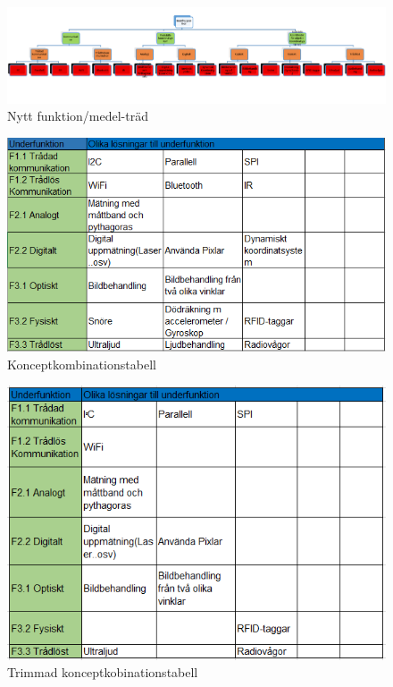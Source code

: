 \documentclass[11pt, a4paper]{report}
\begin{document}
\begin{figure}[H]
	\begin{center}
		\includegraphics [width=12cm,angle=0]{funktionmedel2.png}
		\caption{Nytt funktion/medel-träd}
		\label{fig:funktionmedel2}
	\end{center}
\end{figure}

\begin{figure}[H]
	\begin{center}
		\includegraphics [width=12cm,angle=0]{konceptkombtabell.png}
		\caption{Konceptkombinationstabell}
		\label{fig:koncepttabell1}
	\end{center}
\end{figure}


\begin{figure}[H]
	\begin{center}
		\includegraphics [width=12cm,angle=0]{trimmadtabell.png}
		\caption{Trimmad konceptkobinationstabell }
		\label{fig:koncepttabell2}
	\end{center}
\end{figure}
\end{document}
